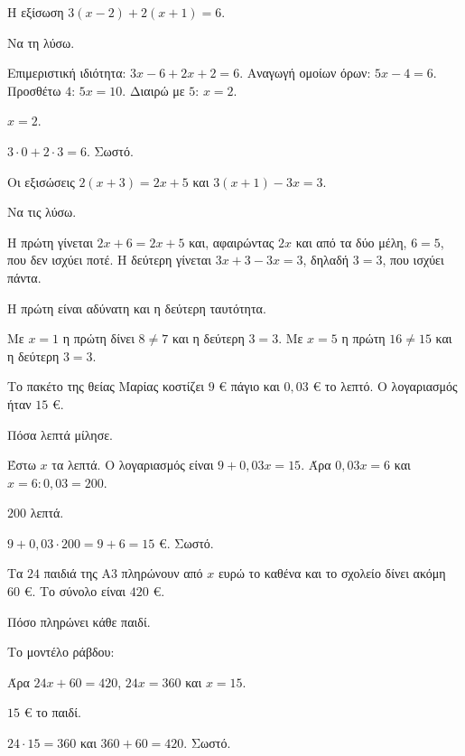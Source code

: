 \tixero Η εξίσωση $3(x-2)+2(x+1)=6$.\par
\tithelo Να τη λύσω.\par
\possindeo Επιμεριστική ιδιότητα: $3x-6+2x+2=6$. Αναγωγή ομοίων όρων: $5x-4=6$. Προσθέτω $4$: $5x=10$. Διαιρώ με $5$: $x=2$.\par
\apantisi $x=2$.\par
\elegxos $3\cdot0+2\cdot3=6$. Σωστό.

\tixero Οι εξισώσεις $2(x+3)=2x+5$ και $3(x+1)-3x=3$.\par
\tithelo Να τις λύσω.\par
\possindeo Η πρώτη γίνεται $2x+6=2x+5$ και, αφαιρώντας $2x$ και από τα δύο μέλη, $6=5$, που δεν ισχύει ποτέ. Η δεύτερη γίνεται $3x+3-3x=3$, δηλαδή $3=3$, που ισχύει πάντα.\par
\apantisi Η πρώτη είναι αδύνατη και η δεύτερη ταυτότητα.\par
\elegxos Με $x=1$ η πρώτη δίνει $8\neq7$ και η δεύτερη $3=3$. Με $x=5$ η πρώτη $16\neq15$ και η δεύτερη $3=3$.

\tixero Το πακέτο της θείας Μαρίας κοστίζει $9$ € πάγιο και $0{,}03$ € το λεπτό. Ο λογαριασμός ήταν $15$ €.\par
\tithelo Πόσα λεπτά μίλησε.\par
\possindeo Έστω $x$ τα λεπτά. Ο λογαριασμός είναι $9+0{,}03x=15$. Άρα $0{,}03x=6$ και $x=6:0{,}03=200$.\par
\apantisi $200$ λεπτά.\par
\elegxos $9+0{,}03\cdot200=9+6=15$ €. Σωστό.

\tixero Τα $24$ παιδιά της Α3 πληρώνουν από $x$ ευρώ το καθένα και το σχολείο δίνει ακόμη $60$ €. Το σύνολο είναι $420$ €.\par
\tithelo Πόσο πληρώνει κάθε παιδί.\par
\possindeo Το μοντέλο ράβδου:
\begin{center}
\end{center}
Άρα $24x+60=420$, $24x=360$ και $x=15$.\par
\apantisi $15$ € το παιδί.\par
\elegxos $24\cdot15=360$ και $360+60=420$. Σωστό.

